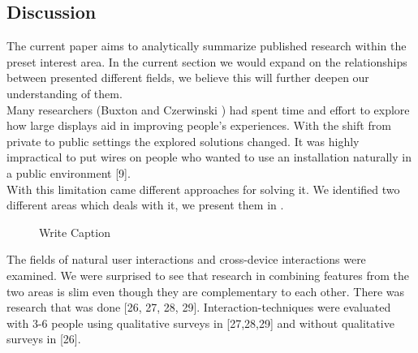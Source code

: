 \subsection{Discussion}

The current paper aims to analytically summarize published research within the preset interest area. In the current section we would expand on the relationships between presented different fields, we believe this will further deepen our understanding of them.\\
Many researchers (Buxton and Czerwinski ) had spent time and effort to explore how large displays aid in improving people's experiences. 
With the shift from private to public settings the explored solutions changed. 
It was highly impractical to put wires on people who wanted to use an installation naturally in a public environment [9].\\

With this limitation came different approaches for solving it. 
We identified two different areas which deals with it, we present them in . 

\begin{figure}[h!]
\centering
{}
\caption{Write Caption}
\label{fig:litreview}
\end{figure}
The fields of natural user interactions and cross-device interactions were examined. 
We were surprised to see that research in combining features from the two areas is slim even though they are complementary to each other. 
There was research that was done [26, 27, 28, 29]. 
Interaction-techniques were evaluated with 3-6 people using qualitative surveys in [27,28,29] and without qualitative surveys in [26].\\

